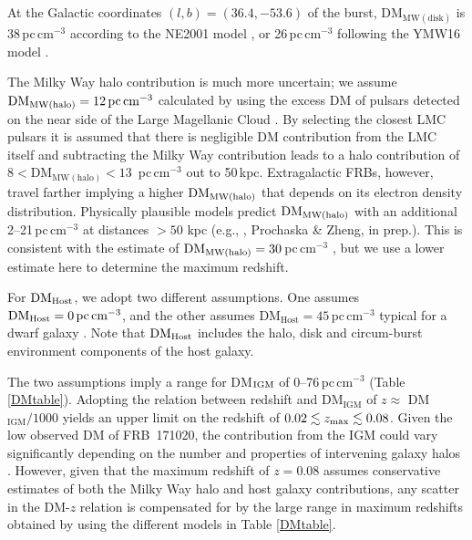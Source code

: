 \documentclass[twocolumn]{aastex63}
\begin{document}
At the Galactic coordinates $(l, b) = (36.4,-53.6)$ of the burst, DM$_{\mathrm{MW(disk)}}$ is 38\,pc\,cm$^{-3}$ according to the NE2001 model \citep{ne2001}, or 26\,pc\,cm$^{-3}$ following the YMW16 model \citep{ymw16}. 

The Milky Way halo contribution is much more uncertain; 
we assume $\rm DM_{\mathrm{MW(halo)}} = 12\, pc\,cm^{-3}$ 
calculated by using the excess DM of pulsars detected on the near side 
of the Large Magellanic Cloud \citep{PSRCAT}. By selecting the closest LMC pulsars it is assumed that there is negligible DM contribution from the LMC itself and subtracting the Milky Way contribution leads to a halo contribution of $8< $DM$_{\mathrm{MW(halo)}} <13$ \,pc\,cm$^{-3}$ out to 50\,kpc. 
Extragalactic FRBs, however, travel farther implying
a higher 
$\rm DM_{\mathrm{MW(halo)}}$ 
that depends on its electron density distribution. 
Physically plausible models predict 
$\rm DM_{\mathrm{MW(halo)}}$ 
with an additional 2--21\,pc\,cm$^{-3}$ 
at distances $>50$ kpc (e.g., 
\citealt{MillerBregman2013}, Prochaska \& Zheng, in prep.). This is consistent with the estimate of $\rm DM_{\mathrm{MW(halo)}} = 30$\,pc\,cm$^{-3}$ \citep{dolag2015}, but we use a lower estimate here to determine the maximum redshift. 

For $\rm DM_{\mathrm{Host}}$,
we adopt two different assumptions. 
One assumes $\rm DM_{\mathrm{Host}} = 0 \rm \,pc\,cm^{-3}$,
and the other assumes 
DM$_{\mathrm{Host}}=45$\,pc\,cm$^{-3}$ typical for a dwarf 
galaxy \citep{Xu2015}. Note that $\rm DM_{\mathrm{Host}}$ includes the halo, disk and circum-burst environment components of the host galaxy.

The two assumptions imply a range for DM$_{\rm IGM}$ 
of 0--76\,pc\,cm$^{-3}$ (Table \ref{DMtable}). 
Adopting the relation between redshift and DM$_{\mathrm{IGM}}$ of $z \approx $ DM$_{\mathrm{IGM}}/1000$ \citep{Ioka2003,Inoue2004} 
yields an upper limit on the redshift of $0.02 \lesssim z_{\rm max} \lesssim 0.08$. 
Given the low observed DM of FRB~171020, the contribution from the IGM could vary significantly depending on the number and properties of intervening galaxy halos \citep{McQuinn2014}. However, given that the maximum redshift of $z=0.08$ assumes conservative estimates of both the Milky Way halo and host galaxy contributions, any scatter in the DM-$z$ relation is compensated for by the large range in maximum redshifts obtained by using the different models in Table \ref{DMtable}.
\end{document}

